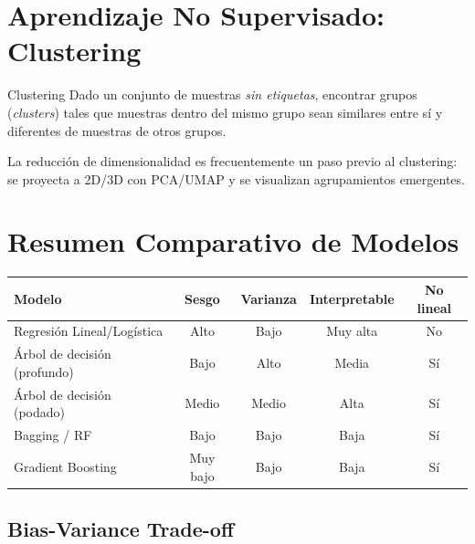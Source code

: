 \documentclass[12pt, a4paper]{article}
\begin{document}
\section{Aprendizaje No Supervisado: Clustering}

\begin{defbox}{Clustering}
	Dado un conjunto de muestras \emph{sin etiquetas}, encontrar grupos (\emph{clusters})
	tales que muestras dentro del mismo grupo sean similares entre sí y diferentes
	de muestras de otros grupos.
\end{defbox}

La reducción de dimensionalidad es frecuentemente un paso previo al clustering:
se proyecta a 2D/3D con PCA/UMAP y se visualizan agrupamientos emergentes.

\section{Resumen Comparativo de Modelos}

\begin{center}
	\begin{tabular}{lcccc}
		\toprule
		\textbf{Modelo}              & \textbf{Sesgo} & \textbf{Varianza} & \textbf{Interpretable} & \textbf{No lineal} \\
		\midrule
		Regresión Lineal/Logística   & Alto           & Bajo              & Muy alta               & No                 \\
		Árbol de decisión (profundo) & Bajo           & Alto              & Media                  & Sí                 \\
		Árbol de decisión (podado)   & Medio          & Medio             & Alta                   & Sí                 \\
		Bagging / RF                 & Bajo           & Bajo              & Baja                   & Sí                 \\
		Gradient Boosting            & Muy bajo       & Bajo              & Baja                   & Sí                 \\
		\bottomrule
	\end{tabular}
\end{center}

\subsection{Bias-Variance Trade-off}
\end{document}
